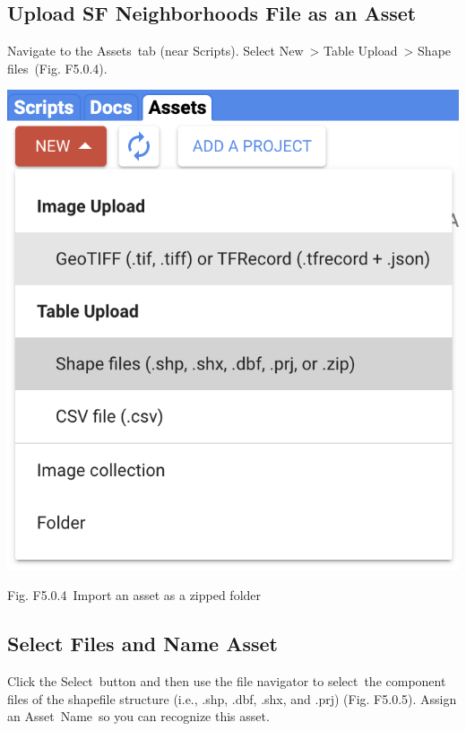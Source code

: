 \documentclass[
  letterpaper,
  DIV=11,
  numbers=noendperiod]{scrreprt}
\begin{document}
\hypertarget{upload-sf-neighborhoods-file-as-an-asset}{%
\subsection{Upload SF Neighborhoods File as an
Asset}\label{upload-sf-neighborhoods-file-as-an-asset}}

Navigate to the Assets~tab (near Scripts). Select New~\textgreater{}
Table Upload~\textgreater{} Shape files~(Fig. F5.0.4).

\includegraphics{./F5/image52.png}

Fig. F5.0.4~Import an asset as a zipped folder

\hypertarget{select-files-and-name-asset}{%
\subsection{Select Files and Name
Asset}\label{select-files-and-name-asset}}

Click the Select~button and then use the file navigator to select~the
component files of the shapefile structure (i.e., .shp, .dbf, .shx, and
.prj) (Fig. F5.0.5). Assign an Asset~Name~so you can recognize this
asset.
\end{document}
